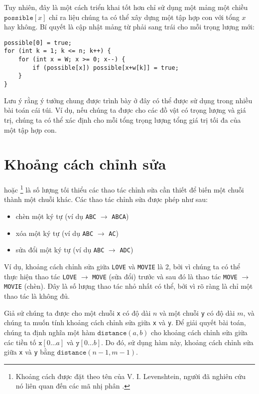 Tuy nhiên, đây là một cách triển khai tốt hơn chỉ sử dụng
một mảng một chiều $\texttt{possible}[x]$
chỉ ra liệu chúng ta có thể xây dựng một tập hợp con với tổng $x$ hay không.
Bí quyết là cập nhật mảng từ phải sang trái cho
mỗi trọng lượng mới:
\begin{lstlisting}
possible[0] = true;
for (int k = 1; k <= n; k++) {
    for (int x = W; x >= 0; x--) {
        if (possible[x]) possible[x+w[k]] = true;
    }
}
\end{lstlisting}

Lưu ý rằng ý tưởng chung được trình bày ở đây có thể được sử dụng
trong nhiều bài toán cái túi.
Ví dụ, nếu chúng ta được cho các đồ vật có trọng lượng và giá trị,
chúng ta có thể xác định cho mỗi tổng trọng lượng tổng giá trị
tối đa của một tập hợp con.

\section{Khoảng cách chỉnh sửa}


 hoặc \footnote{Khoảng cách
được đặt theo tên của V. I. Levenshtein, người đã nghiên cứu nó liên quan đến các mã nhị phân \cite{lev66}.}
là số lượng tối thiểu các thao tác chỉnh sửa
cần thiết để biến một chuỗi
thành một chuỗi khác.
Các thao tác chỉnh sửa được phép như sau:
\begin{itemize}
\item chèn một ký tự (ví dụ \texttt{ABC} $\rightarrow$ \texttt{ABCA})
\item xóa một ký tự (ví dụ \texttt{ABC} $\rightarrow$ \texttt{AC})
\item sửa đổi một ký tự (ví dụ \texttt{ABC} $\rightarrow$ \texttt{ADC})
\end{itemize}

Ví dụ, khoảng cách chỉnh sửa giữa
\texttt{LOVE} và \texttt{MOVIE} là 2,
bởi vì chúng ta có thể thực hiện thao tác
 \texttt{LOVE} $\rightarrow$ \texttt{MOVE}
(sửa đổi) trước và sau đó là thao tác
\texttt{MOVE} $\rightarrow$ \texttt{MOVIE}
(chèn).
Đây là số lượng thao tác nhỏ nhất có thể,
bởi vì rõ ràng là chỉ một thao tác là không đủ.

Giả sử chúng ta được cho một chuỗi \texttt{x}
có độ dài $n$ và một chuỗi \texttt{y} có độ dài $m$,
và chúng ta muốn tính khoảng cách chỉnh sửa giữa
\texttt{x} và \texttt{y}.
Để giải quyết bài toán, chúng ta định nghĩa một hàm
$\texttt{distance}(a,b)$ cho
khoảng cách chỉnh sửa giữa các tiền tố
$\texttt{x}[0 \ldots a]$ và $\texttt{y}[0 \ldots b]$.
Do đó, sử dụng hàm này, khoảng cách chỉnh sửa
giữa \texttt{x} và \texttt{y} bằng $\texttt{distance}(n-1,m-1)$.

